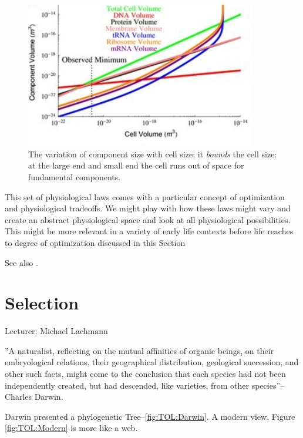 \documentclass[]{article}
\begin{document}
\begin{figure}[H]
	\caption[The variation of component size with cell size]{The variation of component size with cell size; it \textit{bounds} the cell size: at the large end and small end the cell runs out of space for fundamental components.\cite{kempes2016evolutionary}}\label{fig:BacterialPhysiology}
	\includegraphics[width=0.9\textwidth]{BacterialPhysiology}
\end{figure}

This set of physiological laws comes with a particular concept of optimization and physiological tradeoffs. We might play with how these laws might vary and create an abstract physiological space and look at all physiological possibilities. This might be more relevant in a variety of early life contexts before life reaches to degree of optimization discussed in this Section


See also \cite{kempes2011predicting}.

\section{Selection}

Lecturer: Michael Lachmann

''A naturalist, reflecting on the mutual affinities of organic beings, on their embryological relations, their geographical distribution, geological succession, and other such facts, might come to the conclusion that each species had not been independently created, but had descended, like varieties, from other  species''--Charles Darwin\cite{darwin1859origin}.

Darwin\cite{darwin1859origin} presented a phylogenetic Tree--\ref{fig:TOL:Darwin}. A modern view, Figure \ref{fig:TOL:Modern} is more like a web.
\end{document}
